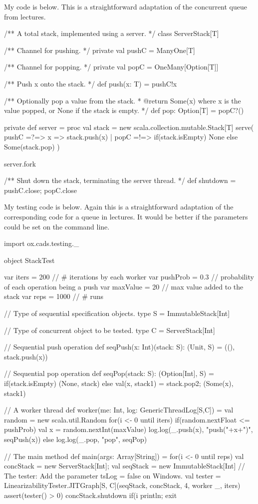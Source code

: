 \begin{answer}
My code is below.  This is a straightforward adaptation of the concurrent
queue from lectures.
%
\begin{scala}
/** A total stack, implemented using a server. */
class ServerStack[T]{
  /** Channel for pushing. */
  private val pushC = ManyOne[T]

  /** Channel for popping. */
  private val popC = OneMany[Option[T]]

  /** Push x onto the stack. */
  def push(x: T) = pushC!x

  /** Optionally pop a value from the stack.
    * @return Some(x) where x is the value popped, or None if the stack is empty. */
  def pop: Option[T] = popC?()

  private def server = proc{
    val stack = new scala.collection.mutable.Stack[T]
    serve(
      pushC =?=> { x => stack.push(x) }
      | popC =!=> { if(stack.isEmpty) None else Some(stack.pop) }
    )
  }

  server.fork

  /** Shut down the stack, terminating the server thread. */
  def shutdown = { pushC.close; popC.close }
}
\end{scala}

My testing code is below.  Again this is a straightforward adaptation of the
corresponding code for a queue in lectures.   It would be better if the
parameters could be set on the command line.  
%
\begin{scala}
import ox.cads.testing._

object StackTest{
  var iters = 200      // # iterations by each worker
  var pushProb = 0.3 // probability of each operation being a push
  var maxValue = 20 // max value added to the stack
  var reps = 1000     // # runs

  // Type of sequential specification objects.
  type S = ImmutableStack[Int]

  // Type of concurrent object to be tested.
  type C = ServerStack[Int]

  // Sequential push operation
  def seqPush(x: Int)(stack: S): (Unit, S) = ((), stack.push(x))

  // Sequential pop operation
  def seqPop(stack: S): (Option[Int], S) =
    if(stack.isEmpty) (None, stack)
    else{ val(x, stack1) = stack.pop2; (Some(x), stack1) }

  // A worker thread
  def worker(me: Int, log: GenericThreadLog[S,C]) = {
    val random = new scala.util.Random
    for(i <- 0 until iters)
      if(random.nextFloat <= pushProb){
        val x = random.nextInt(maxValue)
        log.log(_.push(x), "push("+x+")", seqPush(x))
      }
      else log.log(_.pop, "pop", seqPop)
  }

  // The main method
  def main(args: Array[String]) = {
    for(i <- 0 until reps){
      val concStack = new ServerStack[Int]; val seqStack = new ImmutableStack[Int]
      // The tester: Add the parameter tsLog = false on Windows.
      val tester = LinearizabilityTester.JITGraph[S, C](seqStack, concStack, 4, worker _, iters)
      assert(tester() > 0)
      concStack.shutdown
      if(i%
    }
    println; exit
  }
}
\end{scala}
\end{answer}
